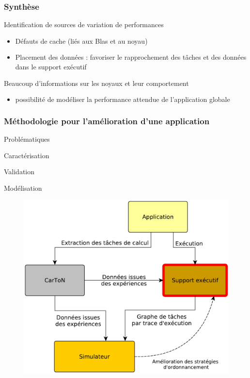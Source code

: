 \documentclass[xcolor={usenames,dvipsnames,svgnames,table}, aspectratio=43]{beamer}
\begin{document}
\begin{frame}
\frametitle{Synthèse}


Identification de sources de variation de performances

\begin{itemize}
  \item Défauts de cache (liés aux Blas et au noyau)
  \item Placement des données : favoriser le rapprochement des tâches et des données dans le support exécutif
\end{itemize}

Beaucoup d'informations sur les noyaux et leur comportement

\begin{itemize}
  \item possibilité de modéliser la performance attendue de l'application globale
\end{itemize}


\end{frame}

\begin{frame}
  \frametitle{Méthodologie pour l'amélioration d'une application}
  \begin{minipage}[t]{0.36\linewidth}
    \begin{block}{Problématiques}
      \begin{itemize}
	{
	  \item Caractérisation
	}
	\item Validation
	{
	  \item Modélisation
	}
      \end{itemize}
    \end{block}
  \end{minipage}
      \hfill
  \begin{minipage}[t]{0.60\linewidth}
    \begin{figure}
      \includegraphics[width=\textwidth]{graph/big_picture-part2.pdf}%
    \end{figure}
  \end{minipage}
\end{frame}
\end{document}
